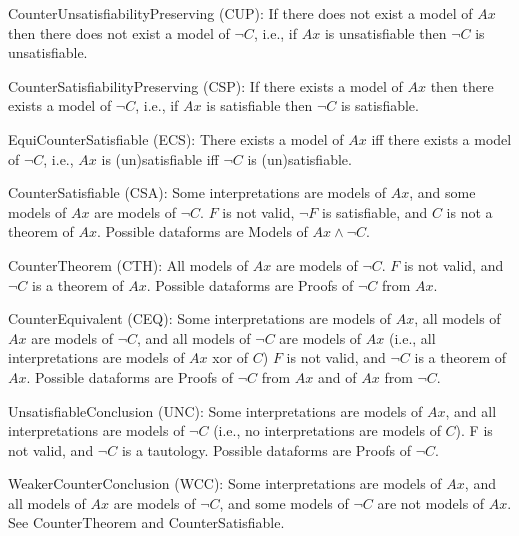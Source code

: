 \documentclass[a4paper]{easychair}
\newenvironment{packed_itemize}{
\vspace*{-0.5em}
\begin{itemize}
  \setlength{\partopsep}{0pt}
  \setlength{\itemsep}{1pt}
  \setlength{\parskip}{0pt}
  \setlength{\parsep}{0pt}
}{\end{itemize}}
\begin{document}
\begin{packed_itemize}
\item CounterUnsatisfiabilityPreserving (CUP):
      If there does not exist a model of $Ax$ then there does not exist a
      model of $\neg C$, i.e., if $Ax$ is unsatisfiable then $\neg C$ is
      unsatisfiable.

\item CounterSatisfiabilityPreserving (CSP):
      If there exists a model of $Ax$ then there exists a model of $\neg C$,
      i.e., if $Ax$ is satisfiable then $\neg C$ is satisfiable.

\item EquiCounterSatisfiable (ECS):
      There exists a model of $Ax$ iff there exists a model of $\neg C$, i.e.,
      $Ax$ is (un)satisfiable iff $\neg C$ is (un)satisfiable.

\item CounterSatisfiable (CSA):
      Some interpretations are models of $Ax$, and
      some models of $Ax$ are models of $\neg C$.
      $F$ is not valid, $\neg F$ is satisfiable, and $C$ is not a theorem
      of $Ax$.
      Possible dataforms are Models of $Ax \wedge \neg C$.

\item CounterTheorem (CTH):
      All models of $Ax$ are models of $\neg C$.
      $F$ is not valid, and $\neg C$ is a theorem of $Ax$.
      Possible dataforms are Proofs of $\neg C$ from $Ax$.

\item CounterEquivalent (CEQ):
      Some interpretations are models of $Ax$,
      all models of $Ax$ are models of $\neg C$, and
      all models of $\neg C$ are models of $Ax$
      (i.e., all interpretations are models of $Ax$ xor of $C$)
      $F$ is not valid, and $\neg C$ is a theorem of $Ax$.
      Possible dataforms are Proofs of $\neg C$ from $Ax$ and of $Ax$
      from $\neg C$.

\item UnsatisfiableConclusion (UNC):
      Some interpretations are models of $Ax$, and
      all interpretations are models of $\neg C$
      (i.e., no interpretations are models of $C$).
      F is not valid, and $\neg C$ is a tautology.
      Possible dataforms are Proofs of $\neg C$.

\item WeakerCounterConclusion (WCC):
      Some interpretations are models of $Ax$, and
      all models of $Ax$ are models of $\neg C$, and
      some models of $\neg C$ are not models of $Ax$.
      See CounterTheorem and CounterSatisfiable.


\end{packed_itemize}
\end{document}
